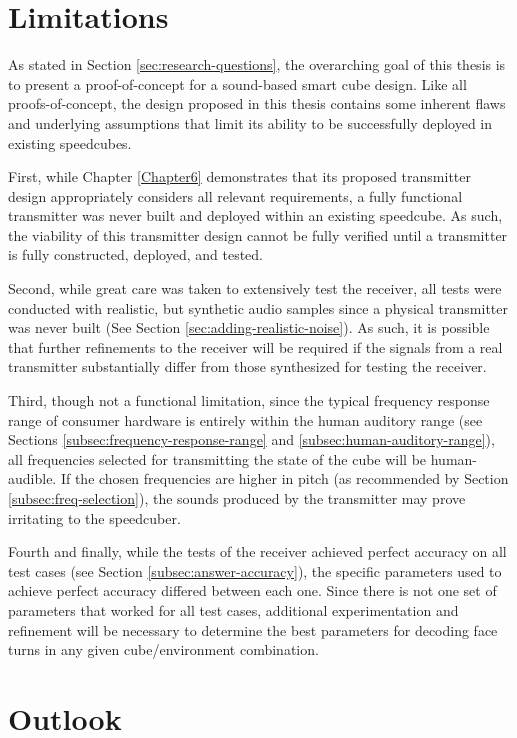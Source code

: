 \section{Limitations}
\label{sec:limitations}

As stated in Section \ref{sec:research-questions}, the overarching goal
of this thesis is to present a proof-of-concept for a sound-based smart
cube design. Like all proofs-of-concept, the design proposed in this
thesis contains some inherent flaws and underlying assumptions that limit
its ability to be successfully deployed in existing speedcubes.

First, while Chapter \ref{Chapter6} demonstrates that its proposed
transmitter design appropriately considers all relevant requirements, a
fully functional transmitter was never built and deployed within an
existing speedcube. As such, the viability of this transmitter design
cannot be fully verified until a transmitter is fully constructed,
deployed, and tested.

Second, while great care was taken to extensively test the receiver,
all tests were conducted with realistic, but synthetic audio samples
since a physical transmitter was never built (See Section
\ref{sec:adding-realistic-noise}). As such, it is possible that further
refinements to the receiver will be required if the signals from a real
transmitter substantially differ from those synthesized for testing the
receiver.

Third, though not a functional limitation, since the typical frequency
response range of consumer hardware is entirely within the human
auditory range (see Sections \ref{subsec:frequency-response-range} and
\ref{subsec:human-auditory-range}), all frequencies selected for
transmitting the state of the cube will be human-audible. If the chosen
frequencies are higher in pitch (as recommended by Section
\ref{subsec:freq-selection}), the sounds produced by the transmitter
may prove irritating to the speedcuber. 

Fourth and finally, while the tests of the receiver achieved perfect
accuracy on all test cases (see Section \ref{subsec:answer-accuracy}),
the specific parameters used to achieve perfect accuracy differed
between each one. Since there is not one set of parameters that worked
for all test cases, additional experimentation and refinement will be
necessary to determine the best parameters for decoding face turns in
any given cube/environment combination.


\section{Outlook}
\label{sec:outlook}

